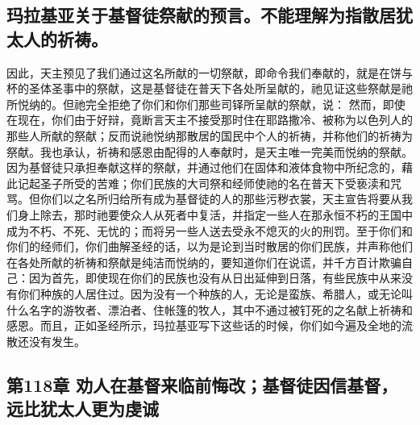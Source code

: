 
\subsection{玛拉基亚关于基督徒祭献的预言。不能理解为指散居犹太人的祈祷。}

 因此，天主预见了我们通过这名所献的一切祭献，即命令我们奉献的，就是在饼与杯的圣体圣事中的祭献，这是基督徒在普天下各处所呈献的，祂见证这些祭献是祂所悦纳的。但祂完全拒绝了你们和你们那些司铎所呈献的祭献，说： 然而，即使在现在，你们由于好辩，竟断言天主不接受那时住在耶路撒冷、被称为以色列人的那些人所献的祭献；反而说祂悦纳那散居的国民中个人的祈祷，并称他们的祈祷为祭献。我也承认，祈祷和感恩由配得的人奉献时，是天主唯一完美而悦纳的祭献。因为基督徒只承担奉献这样的祭献，并通过他们在固体和液体食物中所纪念的，藉此记起圣子所受的苦难；你们民族的大司祭和经师使祂的名在普天下受亵渎和咒骂。但你们以之名所归给所有成为基督徒的人的那些污秽衣裳，天主宣告将要从我们身上除去，那时祂要使众人从死者中复活，并指定一些人在那永恒不朽的王国中成为不朽、不死、无忧的；而将另一些人送去受永不熄灭的火的刑罚。至于你们和你们的经师们，你们曲解圣经的话，以为是论到当时散居的你们民族，并声称他们在各处所献的祈祷和祭献是纯洁而悦纳的，要知道你们在说谎，并千方百计欺骗自己：因为首先，即使现在你们的民族也没有从日出延伸到日落，有些民族中从来没有你们种族的人居住过。因为没有一个种族的人，无论是蛮族、希腊人，或无论叫什么名字的游牧者、漂泊者、住帐篷的牧人，其中不通过被钉死的之名献上祈祷和感恩。而且，正如圣经所示，玛拉基亚写下这些话的时候，你们如今遍及全地的流散还没有发生。\par


\subsection{第118章 劝人在基督来临前悔改；基督徒因信基督，远比犹太人更为虔诚}

